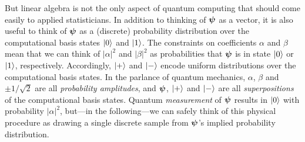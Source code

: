 \documentclass[12pt]{article} %
\begin{document}
But linear algebra is not the only aspect of quantum computing that should come easily to applied statisticians. In addition to thinking of $\boldsymbol{\psi}$ as a vector, it is also useful to think of $\boldsymbol{\psi}$ as a (discrete) probability distribution over the computational basis states $\ket{0}$ and $\ket{1}$. The constraints on coefficients $\alpha$ and $\beta$ mean that we can think of $|\alpha|^2$ and $|\beta|^2$ as probabilities that $\boldsymbol{\psi}$ is in state $\ket{0}$ or $\ket{1}$, respectively.  Accordingly, $\ket{+}$ and $\ket{-}$ encode uniform distributions over the computational basis states.  In the parlance of quantum mechanics, $\alpha$, $\beta$ and $\pm1/\sqrt{2}$ are all \emph{probability amplitudes}, and $\boldsymbol{\psi}$, $\ket{+}$ and $\ket{-}$ are all \emph{superpositions} of the computational basis states. Quantum \emph{measurement} of $\boldsymbol{\psi}$ results in $\ket{0}$ with probability $|\alpha|^2$, but---in the following---we can safely think of this physical procedure as drawing a single discrete sample from $\boldsymbol{\psi}$'s implied probability distribution.
\end{document}
